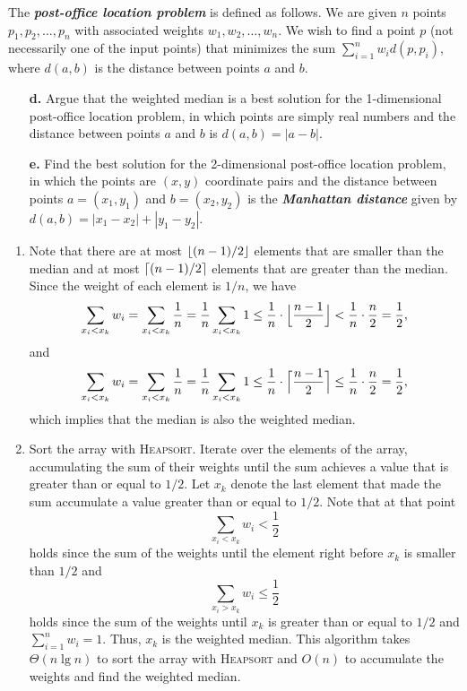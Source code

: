 \begin{enumerate}
{The \textbf{\emph{post-office location problem}} is defined as follows. We are
given $n$ points $p_1, p_2, \dots, p_n$ with associated weights
$w_1, w_2, \dots, w_n$. We wish to find a point $p$ (not necessarily one of the
input points) that minimizes the sum $\sum_{i = 1}^n w_i d(p, p_i)$, where
$d(a, b)$ is the distance between points $a$ and $b$.

\begin{enumerate}
\item[\textbf{d.}] Argue that the weighted median is a best solution for the
1-dimensional post-office location problem, in which points are simply real
numbers and the distance between points $a$ and $b$ is $d(a, b) = |a - b|$.

\item[\textbf{e.}] Find the best solution for the 2-dimensional post-office
location problem, in which the points are $(x, y)$ coordinate pairs and the
distance between points $a = (x_1, y_1)$ and $b = (x_2, y_2)$ is the
\textbf{\emph{Manhattan distance}} given by
$d(a, b) = |x_1 - x_2| + |y_1 - y_2|$.
\end{enumerate}
}

\begin{framed}
\begin{enumerate}
\item Note that there are at most $\lfloor(n - 1)/2\rfloor$ elements that are smaller
than the median and at most $\lceil(n - 1)/2\rceil$ elements that are greater than
the median. Since the weight of each element is $1/n$, we have
\[
  \sum_{x_i < x_k} w_i = \sum_{x_i < x_k} \frac{1}{n}
    = \frac{1}{n} \sum_{x_i < x_k} 1
    \le \frac{1}{n} \cdot \Bigl\lfloor \frac{n - 1}{2} \Bigr\rfloor
    < \frac{1}{n} \cdot \frac{n}{2} = \frac{1}{2},
\]
and
\[
  \sum_{x_i < x_k} w_i = \sum_{x_i < x_k} \frac{1}{n}
  = \frac{1}{n} \sum_{x_i < x_k} 1
  \le \frac{1}{n} \cdot \Bigl\lceil \frac{n - 1}{2} \Bigr\rceil
  \le \frac{1}{n} \cdot \frac{n}{2} = \frac{1}{2},
\]
which implies that the median is also the weighted median.

\item Sort the array with \textsc{Heapsort}. Iterate over the elements of the
array, accumulating the sum of their weights until the sum achieves a value that
is greater than or equal to $1/2$. Let $x_k$ denote the last element that made
the sum accumulate a value greater than or equal to $1/2$. Note that at that
point
\[
  \sum_{x_i < x_k} w_i < \frac{1}{2}
\]
holds since the sum of the weights until the element right before $x_k$ is
smaller than $1/2$ and
\[
  \sum_{x_i > x_k} w_i \le \frac{1}{2}
\]
holds since the sum of the weights until $x_k$ is greater than or equal to $1/2$
and $\sum_{i = 1}^{n} w_i = 1$. Thus, $x_k$ is the weighted median. This
algorithm takes $\Theta(n \lg n)$ to sort the array with \textsc{Heapsort} and
$O(n)$ to accumulate the weights and find the weighted median.


\end{enumerate}
\end{framed}
\end{enumerate}
